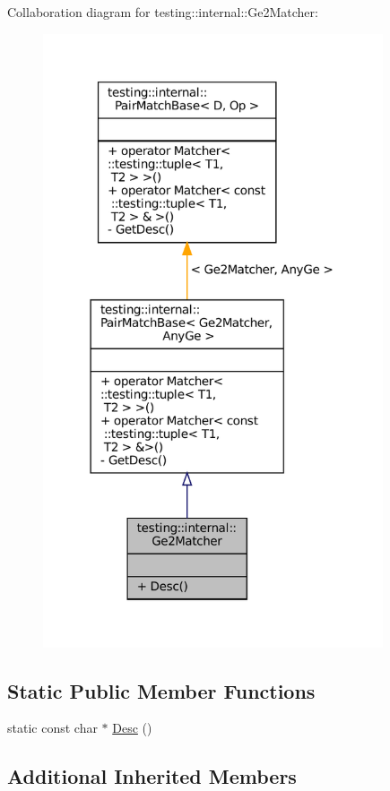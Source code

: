 Collaboration diagram for testing\+:\+:internal\+:\+:Ge2\+Matcher\+:
\nopagebreak
\begin{figure}[H]
\begin{center}
\leavevmode
\includegraphics[width=284pt]{classtesting_1_1internal_1_1Ge2Matcher__coll__graph}
\end{center}
\end{figure}
\subsection*{Static Public Member Functions}
\begin{DoxyCompactItemize}
\item 
static const char $\ast$ \hyperlink{classtesting_1_1internal_1_1Ge2Matcher_a29fa53bdfa6778b709eaef017aeea855}{Desc} ()
\end{DoxyCompactItemize}
\subsection*{Additional Inherited Members}


